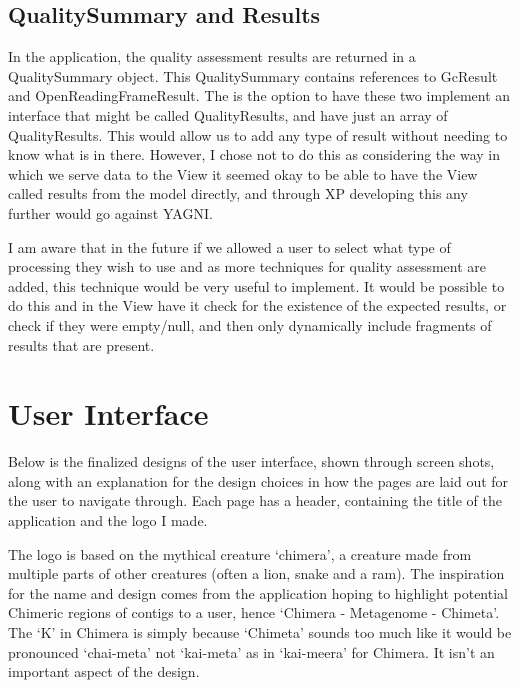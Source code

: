 \subsection{QualitySummary and Results}
In the application, the quality assessment results are returned in a QualitySummary object. This QualitySummary contains references to GcResult and OpenReadingFrameResult. The is the option to have these two implement an interface that might be called QualityResults, and have just an array of QualityResults. This would allow us to add any type of result without needing to know what is in there. However, I chose not to do this as considering the way in which we serve data to the View it seemed okay to be able to have the View called results from the model directly, and through XP developing this any further would go against YAGNI. 

I am aware that in the future if we allowed a user to select what type of processing they wish to use and as more techniques for quality assessment are added, this technique would be very useful to implement. It would be possible to do this and in the View have it check for the existence of the expected results, or check if they were empty/null, and then only dynamically include fragments of results that are present. 

\section{User Interface}
Below is the finalized designs of the user interface, shown through screen shots, along with an explanation for the design choices in how the pages are laid out for the user to navigate through. Each page has a header, containing the title of the application and the logo I made. 

The logo is based on the mythical creature `chimera', a creature made from multiple parts of other creatures (often a lion, snake and a ram). The inspiration for the name and design comes from the application hoping to highlight potential Chimeric regions of contigs to a user, hence `Chimera - Metagenome - Chimeta'. The `K' in Chimera is simply because `Chimeta' sounds too much like it would be pronounced `chai-meta' not `kai-meta' as in `kai-meera' for Chimera. It isn't an important aspect of the design.

